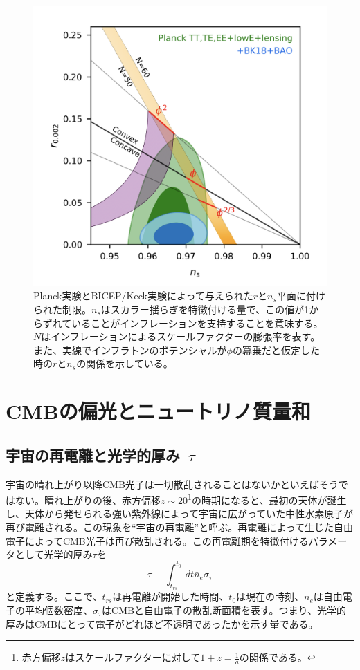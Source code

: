 \begin{figure}[htbp]
  \centering
  \includegraphics[width=0.6\columnwidth]{2_cosmology/figs/latest_results.png}
  \caption{Planck実験とBICEP/Keck実験によって与えられた$r$と$n_{s}$平面に付けられた制限\cite{const_r}。$n_{s}$はスカラー揺らぎを特徴付ける量で、この値が1からずれていることがインフレーションを支持することを意味する。$N$はインフレーションによるスケールファクターの膨張率を表す。また、実線でインフラトンのポテンシャルが$\phi$の冪乗だと仮定した時の$r$と$n_{s}$の関係を示している。}
  \label{const_r}
\end{figure}

\section{CMBの偏光とニュートリノ質量和}

\subsection{宇宙の再電離と光学的厚み~$\tau$}
\label{reion_and_tau}
宇宙の晴れ上がり以降CMB光子は一切散乱されることはないかといえばそうではない。晴れ上がりの後、赤方偏移$z\sim 20$\footnote{赤方偏移$z$はスケールファクターに対して$1+z = \frac{1}{a}$の関係である。}の時期になると、最初の天体が誕生し、天体から発せられる強い紫外線によって宇宙に広がっていた中性水素原子が再び電離される。この現象を``宇宙の再電離''と呼ぶ。再電離によって生じた自由電子によってCMB光子は再び散乱される。この再電離期を特徴付けるパラメータとして光学的厚み$\tau$を
\begin{equation}
  \tau\equiv\int_{t_{rs}}^{t_{0}}dt\bar{n}_{e}\sigma_{\tau}
\end{equation}
と定義する。ここで、$t_{rs}$は再電離が開始した時間、$t_{0}$は現在の時刻、$\bar{n}_{e}$は自由電子の平均個数密度、$\sigma_{\tau}$はCMBと自由電子の散乱断面積を表す。つまり、光学的厚みはCMBにとって電子がどれほど不透明であったかを示す量である。

